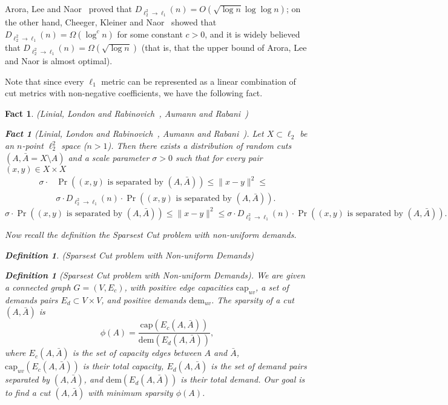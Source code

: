 \documentclass[twoside,leqno,twocolumn]{article}
\newcommand {\brc}   [1] {\left(#1\right)}
\newcommand {\Prob}  [1] {\Pr \brc{#1 }}
\newtheorem{Definition}[theorem]{Definition}
\newtheorem{fact}[theorem]{Fact}
\begin{document}
Arora, Lee and Naor~\cite{ALN} proved that $D_{\ell_2^2\to \ell_1}(n) = O(\sqrt{\log n}\log\log n)$; on the other hand,
Cheeger, Kleiner and Naor~\cite{CKN} showed that $D_{\ell_2^2\to \ell_1}(n) = \Omega(\log^c n)$ for some constant $c>0$, and it is 
widely believed that $D_{\ell_2^2\to \ell_1}(n) = \Omega(\sqrt{\log n})$ (that is, that the upper bound of Arora, Lee and Naor is
almost optimal).

Note that since every $\ell_1$ metric can be represented as a linear combination of cut metrics with non-negative coefficients, we have the following fact.
\ifSODA
\begin{fact}{\sc (Linial, London and Rabinovich~\cite{LLR}, Aumann and Rabani~\cite{AR})}
\else
\begin{fact}[Linial, London and Rabinovich~\cite{LLR}, Aumann and Rabani~\cite{AR}]
\fi
\label{fact:cut-embedding}
Let $X \subset \ell_2$ be an $n$-point $\ell_2^2$ space ($n>1$). 
Then there exists a distribution of random cuts $(A, \bar A = X\setminus A)$
and a scale parameter $\sigma > 0$ such that for every pair $(x,y)\in X \times X$
\ifSODA
\begin{align*}
\sigma \cdot{} & \Prob{(x,y) \text{ is separated by } (A,\bar A)} \leq 
\|x-y\|^2 \leq \\
&\sigma \cdot D_{\ell_2^2\to \ell_1}(n) \cdot \Prob{(x,y) \text{ is separated by } (A,\bar A)}.
\end{align*}
\else
$$\sigma \cdot \Prob{(x,y) \text{ is separated by } (A,\bar A)} \leq \|x-y\|^2 \leq \sigma \cdot D_{\ell_2^2\to \ell_1}(n) \cdot \Prob{(x,y) \text{ is separated by } (A,\bar A)}.$$
\fi
\end{fact}

Now recall the definition the Sparsest Cut problem with non-uniform demands.
\ifSODA
\begin{Definition} {\sc (Sparsest Cut problem with Non-uniform Demands)}\label{def:nuSparseCut}
\else
\begin{Definition}[Sparsest Cut problem with Non-uniform Demands]\label{def:nuSparseCut}
\fi
We are given a connected graph $G=(V, E_c)$, 
with positive edge capacities $\mathrm{cap}_{uv}$, a set of demands pairs $E_d\subset V \times V$,
and positive demands $\mathrm{dem}_{uv}$. The sparsity of a cut $(A, \bar A)$ is
$$\phi(A) = \frac{\mathrm{cap}(E_c(A,\bar A))}{\mathrm{dem}(E_d(A,\bar A))},
$$
where $E_c(A,\bar A)$ is the set of capacity edges between $A$ and $\bar A$, $\mathrm{cap}_{uv}(E_c(A,\bar A))$ is their total capacity,
$E_d(A,\bar A)$ is the set of demand pairs separated by $(A,\bar A)$, and $\mathrm{dem}(E_d(A,\bar A))$ is their total demand.
Our goal is to find a cut $(A,\bar A)$ with minimum sparsity $\phi(A)$.



\end{Definition}
\end{Definition}
\end{fact}
\end{document}
